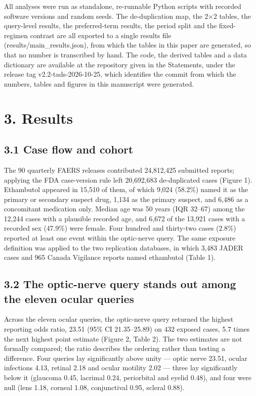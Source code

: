 \documentclass[12pt,a4paper]{article}
\begin{document}
All analyses were run as standalone, re-runnable Python scripts with recorded software versions and random seeds. The de-duplication map, the 2×2 tables, the query-level results, the preferred-term results, the period split and the fixed-regimen contrast are all exported to a single results file (results/main\_results.json), from which the tables in this paper are generated, so that no number is transcribed by hand. The code, the derived tables and a data dictionary are available at the repository given in the Statements, under the release tag v2.2-tads-2026-10-25, which identifies the commit from which the numbers, tables and figures in this manuscript were generated.

\section*{3. Results}

\subsection*{3.1 Case flow and cohort}

The 90 quarterly FAERS releases contributed 24,812,425 submitted reports; applying the FDA case-version rule left 20,692,683 de-duplicated cases (Figure 1). Ethambutol appeared in 15,510 of them, of which 9,024 (58.2\%) named it as the primary or secondary suspect drug, 1,134 as the primary suspect, and 6,486 as a concomitant medication only. Median age was 50 years (IQR 32–67) among the 12,244 cases with a plausible recorded age, and 6,672 of the 13,921 cases with a recorded sex (47.9\%) were female. Four hundred and thirty-two cases (2.8\%) reported at least one event within the optic-nerve query. The same exposure definition was applied to the two replication databases, in which 3,483 JADER cases and 965 Canada Vigilance reports named ethambutol (Table 1).

\subsection*{3.2 The optic-nerve query stands out among the eleven ocular queries}

Across the eleven ocular queries, the optic-nerve query returned the highest reporting odds ratio, 23.51 (95\% CI 21.35–25.89) on 432 exposed cases, 5.7 times the next highest point estimate (Figure 2, Table 2). The two estimates are not formally compared; the ratio describes the ordering rather than testing a difference. Four queries lay significantly above unity — optic nerve 23.51, ocular infections 4.13, retinal 2.18 and ocular motility 2.02 — three lay significantly below it (glaucoma 0.45, lacrimal 0.24, periorbital and eyelid 0.48), and four were null (lens 1.18, corneal 1.08, conjunctival 0.95, scleral 0.88).
\end{document}
